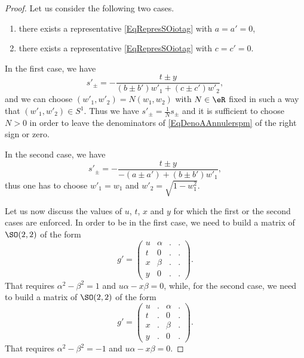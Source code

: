 \begin{proof}
		Let us consider the following two cases.
		\begin{enumerate}
			\item
			      there exists a representative \eqref{EqRepresSOiotag} with $a=a'=0$,
			\item
			      there exists a representative \eqref{EqRepresSOiotag} with $c=c'=0$.
		\end{enumerate}
		In the first case, we have
		\begin{equation}		\label{EqDenoAAnnulerspm}
			s'_{\pm}=-\frac{ t\pm y }{ (b\pm b')w'_1+(c\pm c')w'_2 },
		\end{equation}
		and we can choose $(w'_1,w'_2)=N(w_1,w_2)$ with $N\in\eR$ fixed in such a way that $(w'_1,w'_2)\in S^1$. Thus we have $s'_{\pm}=\frac{1}{ N }s_{\pm}$ and it is sufficient to choose $N>0$ in order to leave the denominators of \eqref{EqDenoAAnnulerspm} of the right sign or zero.

		In the second case, we have
		\begin{equation}
			s'_{\pm}=-\frac{ t\pm y }{ -(a\pm a')+(b\pm b')w'_1 },
		\end{equation}
		thus one has to choose $w'_1=w_1$ and $w'_2=\sqrt{1-w_1^2}$.

		Let us now discuss the values of $u$, $t$, $x$ and $y$ for which the first or the second cases are enforced. In order to be in the first case, we need to build a matrix of $\SO(2,2)$ of the form
		\begin{equation}
			g'=\begin{pmatrix}
				u & \alpha & . & . \\
				t & 0      & . & . \\
				x & \beta  & . & . \\
				y & 0      & . & .
			\end{pmatrix}.
		\end{equation}
		That requires $\alpha^2-\beta^2=1$ and $u\alpha-x\beta=0$, while, for the second case, we need to build a matrix of $\SO(2,2)$ of the form
		\begin{equation}
			g'=\begin{pmatrix}
				u & . & \alpha & . \\
				t & . & 0      & . \\
				x & . & \beta  & . \\
				y & . & 0      & .
			\end{pmatrix}.
		\end{equation}
		That requires $\alpha^2-\beta^2=-1$ and $u\alpha-x\beta=0$.


\end{proof}
